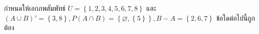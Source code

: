 ﻿%
\question กำหนดให้เอกภพสัมพัทธ์ $U=\left\{1,2,3,4,5,6,7,8\right\} $ และ $(A\cup B)'=\left\{3,8\right\}, P(A\cap B)=\left\{\varnothing, \left\{5\right\} \right\}, B-A=\left\{2,6,7\right\} $ ข้อใดต่อไปนี้ถูกต้อง
\newline
{}
